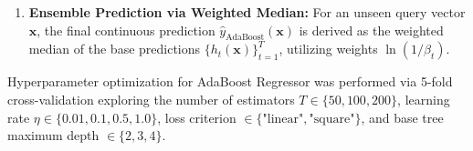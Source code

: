 \documentclass[12pt,a4paper]{article}
\begin{document}
\begin{enumerate}
\begin{itemize}
        \begin{equation}
            \beta_t = \frac{\bar{L}_t}{1 - \bar{L}_t}
        \end{equation}
        Lower average loss $\bar{L}_t$ yields lower $\beta_t \in (0, 1)$, indicating higher estimator confidence.
        \item Update the instance weight distribution for the subsequent iteration:
        \begin{equation}
            w_i^{(t+1)} = \frac{w_i^{(t)} \beta_t^{1 - L_{t,i}}}{Z_t}
        \end{equation}
        where $Z_t = \sum_{i=1}^n w_i^{(t)} \beta_t^{1 - L_{t,i}}$ represents the partition normalizing constant ensuring $\sum_i w_i^{(t+1)} = 1$. Consequently, observations exhibiting low error ($L_{t,i} \approx 0$) receive attenuated weights, while poorly predicted observations ($L_{t,i} \approx 1$) retain comparatively elevated weights in subsequent iterations.
    \end{itemize}
    
    \item \textbf{Ensemble Prediction via Weighted Median:} For an unseen query vector $\mathbf{x}$, the final continuous prediction $\hat{y}_{\text{AdaBoost}}(\mathbf{x})$ is derived as the weighted median of the base predictions $\{h_t(\mathbf{x})\}_{t=1}^T$, utilizing weights $\ln(1 / \beta_t)$.
\end{enumerate}

Hyperparameter optimization for AdaBoost Regressor was performed via 5-fold cross-validation exploring the number of estimators $T \in \{50, 100, 200\}$, learning rate $\eta \in \{0.01, 0.1, 0.5, 1.0\}$, loss criterion $\in \{\text{"linear"}, \text{"square"}\}$, and base tree maximum depth $\in \{2, 3, 4\}$.
\end{document}
